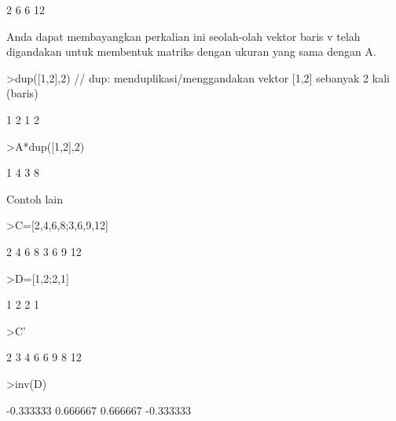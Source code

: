 \documentclass[12pt,arial,letterpaper]{book}
\begin{document}
\begin{eulercomment}
\begin{eulercomment}
\begin{eulerprompt}
\end{eulerprompt}
\begin{euleroutput}
              2             6 
              6            12 
\end{euleroutput}
\begin{eulercomment}
Anda dapat membayangkan perkalian ini seolah-olah vektor baris v telah
digandakan untuk membentuk matriks dengan ukuran yang sama dengan A.
\end{eulercomment}
\begin{eulerprompt}
>dup([1,2],2) // dup: menduplikasi/menggandakan vektor [1,2] sebanyak 2 kali (baris)
\end{eulerprompt}
\begin{euleroutput}
              1             2 
              1             2 
\end{euleroutput}
\begin{eulerprompt}
>A*dup([1,2],2) 
\end{eulerprompt}
\begin{euleroutput}
              1             4 
              3             8 
\end{euleroutput}
\begin{eulercomment}
Contoh lain
\end{eulercomment}
\begin{eulerprompt}
>C=[2,4,6,8;3,6,9,12]
\end{eulerprompt}
\begin{euleroutput}
              2             4             6             8 
              3             6             9            12 
\end{euleroutput}
\begin{eulerprompt}
>D=[1,2;2,1]
\end{eulerprompt}
\begin{euleroutput}
              1             2 
              2             1 
\end{euleroutput}
\begin{eulerprompt}
>C'
\end{eulerprompt}
\begin{euleroutput}
              2             3 
              4             6 
              6             9 
              8            12 
\end{euleroutput}
\begin{eulerprompt}
>inv(D)
\end{eulerprompt}
\begin{euleroutput}
      -0.333333      0.666667 
       0.666667     -0.333333 

\end{euleroutput}
\end{eulercomment}
\end{eulercomment}
\end{document}
